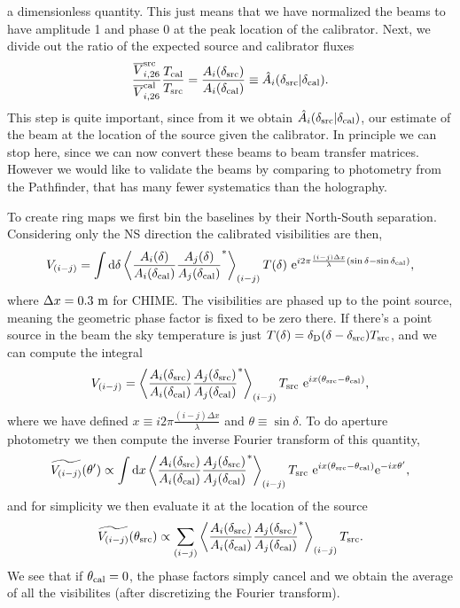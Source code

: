 a dimensionless quantity. This just means that we have normalized the beams to have amplitude 1 and phase 0 at the peak location of the calibrator. Next, we divide out the ratio of the expected source and calibrator fluxes
\begin{align}
\frac{\overline{V}^{\rm src}_{i,{\rm 26}}}{\overline{V}^{\rm cal}_{i,{\rm 26}}} \frac{T_{\rm cal}}{T_{\rm src}} = \frac{A_i(\delta_{\rm src})}{A_i(\delta_{\rm cal})}\equiv \hat{A}_i(\delta_{\rm src} | \delta_{\rm cal}).
\end{align}
This step is quite important, since from it we obtain $\hat{A}_i(\delta_{\rm src} | \delta_{\rm cal})$, our estimate of the beam at the location of the source given the calibrator. In principle we can stop here, since we can now convert these beams to beam transfer matrices. However we would like to validate the beams by comparing to photometry from the Pathfinder, that has many fewer systematics than the holography. 

To create ring maps we first bin the baselines by their North-South separation. Considering only the NS direction the calibrated visibilities are then,
\begin{align}
V_{(i-j)} = \int {\rm d} \delta \left\langle \frac{A_i(\delta)}{A_i(\delta_{\rm cal})} \frac{A_j(\delta)}{A_j(\delta_{\rm cal})}^* \right\rangle_{(i-j)} T(\delta) ~ {\rm e}^{i2\pi \frac{(i-j) \Delta x}{\lambda}(\sin{\delta} - \sin{\delta_{\rm cal}})}, 
\end{align}
where $\Delta x = 0.3~{\rm m}$ for CHIME. The visibilities are phased up to the point source, meaning the geometric phase factor is fixed to be zero there. If there's a point source in the beam the sky temperature is just $T(\delta) = \delta_{\rm D}(\delta - \delta_{\rm src}) T_{\rm src}$, and we can compute the integral
\begin{align}
V_{(i-j)} = \left\langle \frac{A_i(\delta_{\rm src})}{A_i(\delta_{\rm cal})} \frac{A_j(\delta_{\rm src})}{A_j(\delta_{\rm cal})}^* \right\rangle_{(i-j)} T_{\rm src} ~ {\rm e}^{ix(\theta_{\rm src} - \theta_{\rm cal})},
\end{align}
where we have defined $x \equiv i2\pi \frac{(i-j) \Delta x}{\lambda}$ and $\theta \equiv \sin{\delta}$. To do aperture photometry we then compute the inverse Fourier transform of this quantity,
\begin{align}
\widetilde{V_{(i-j)}}(\theta') \propto \int {\rm d} x \left\langle \frac{A_i(\delta_{\rm src})}{A_i(\delta_{\rm cal})} \frac{A_j(\delta_{\rm src})}{A_j(\delta_{\rm cal})}^* \right\rangle_{(i-j)} T_{\rm src} ~ {\rm e}^{ix(\theta_{\rm src} - \theta_{\rm cal})} {\rm e}^{-ix\theta'},
\end{align}
and for simplicity we then evaluate it at the location of the source
\begin{align}
\widetilde{V_{(i-j)}}(\theta_{\rm src}) \propto \sum_{(i-j)} \left\langle \frac{A_i(\delta_{\rm src})}{A_i(\delta_{\rm cal})} \frac{A_j(\delta_{\rm src})}{A_j(\delta_{\rm cal})}^* \right\rangle_{(i-j)} T_{\rm src}. \label{photometry}
\end{align}
We see that if $\theta_{\rm cal} = 0$, the phase factors simply cancel and we obtain the average of all the visibilites (after discretizing the Fourier transform).

